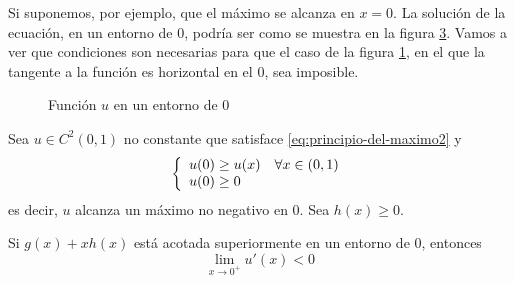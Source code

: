 Si suponemos, por ejemplo, que el máximo se alcanza en $x=0$. La solución de la ecuación, en un entorno de $0$, podría ser como se muestra en la figura \ref{fig:sol-entorno-cero}. Vamos a ver que condiciones son necesarias para que el caso de la figura \ref{fig:sol-entorno-cero-a}, en el que la tangente a la función es horizontal en el $0$, sea imposible.

\begin{figure}[ht]
\centering
\begin{subfigure}{.5\textwidth}
	\centering
	\caption{}
	\label{fig:sol-entorno-cero-a}
\end{subfigure}%
\begin{subfigure}{.5\textwidth}
	\centering
	\caption{}
	\label{fig:sol-entorno-cero-b}
\end{subfigure}%

\caption{Función $u$ en un entorno de $0$}
\label{fig:sol-entorno-cero}
\end{figure}

\newpage
\begin{theorem}\label{theorem2}
Sea $u\in C^2(0,1)$ no constante que satisface \eqref{eq:principio-del-maximo2} y 
\begin{equation*}
\left\{
\begin{array}{l l}
u(0) \ge u(x) & \forall x \in (0,1)\\
u(0) \ge 0
\end{array}
\right.
\end{equation*}
es decir, $u$ alcanza un máximo no negativo en $0$.
Sea $h(x) \ge 0$.

Si $g(x) + xh(x)$ está acotada superiormente en un entorno de $0$, entonces
$$\lim_{x\to0^+}u'(x) < 0$$
\end{theorem}

